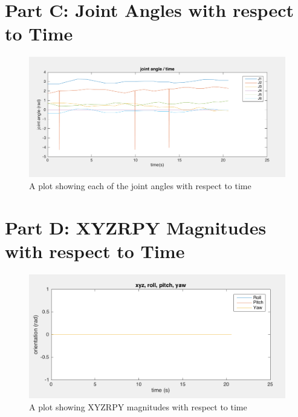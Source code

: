 \documentclass[a4paper, 10pt]{article}
\begin{document}
\section{Part C: Joint Angles with respect to Time}

\begin{figure}[H]
  \includegraphics[width=\linewidth]{images/angle}
  \caption{A plot showing each of the joint angles with respect to time}
  \label{fig:A plot showing each of the joint angles with respect to time}
\end{figure}


\section{Part D: XYZRPY Magnitudes with respect to Time}

\begin{figure}[H]
  \includegraphics[width=\linewidth]{images/ore}
  \caption{A plot showing XYZRPY magnitudes with respect to time}
  \label{fig:A plot showing XYZRPY magnitudes with respect to time}
\end{figure}

\clearpage
\end{document}
